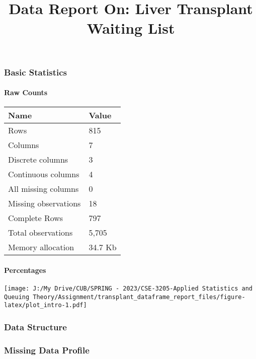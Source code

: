 \documentclass[
]{article}
\title{Data Report On: Liver Transplant Waiting List}
\author{}
\date{\vspace{-2.5em}}
\begin{document}
\maketitle

\hypertarget{basic-statistics}{%
\subsubsection{Basic Statistics}\label{basic-statistics}}

\hypertarget{raw-counts}{%
\paragraph{Raw Counts}\label{raw-counts}}

\begin{longtable}[]{@{}ll@{}}
\toprule()
Name & Value \\
\midrule()
\endhead
Rows & 815 \\
Columns & 7 \\
Discrete columns & 3 \\
Continuous columns & 4 \\
All missing columns & 0 \\
Missing observations & 18 \\
Complete Rows & 797 \\
Total observations & 5,705 \\
Memory allocation & 34.7 Kb \\
\bottomrule()
\end{longtable}

\hypertarget{percentages}{%
\paragraph{Percentages}\label{percentages}}

\texttt{[image: J:/My Drive/CUB/SPRING - 2023/CSE-3205-Applied Statistics and Queuing Theory/Assignment/transplant\_dataframe\_report\_files/figure-latex/plot\_intro-1.pdf]}

\hypertarget{data-structure}{%
\subsubsection{Data Structure}\label{data-structure}}

\hypertarget{missing-data-profile}{%
\subsubsection{Missing Data Profile}\label{missing-data-profile}}
\end{document}
